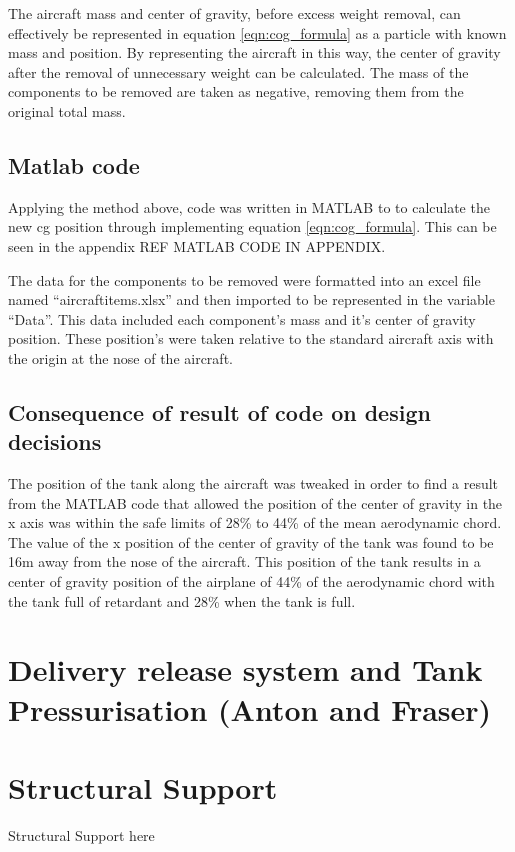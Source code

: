 The aircraft mass and center of gravity, before excess weight removal, can effectively be represented in equation \ref{eqn:cog_formula} as a particle with known mass and position.
By representing the aircraft in this way, the center of gravity after the removal of unnecessary weight can be calculated.
The mass of the components to be removed are taken as negative, removing them from the original total mass.

\subsection{Matlab code}
Applying the method above, code was written in MATLAB to to calculate the new cg position through implementing equation \ref{eqn:cog_formula}.
This can be seen in the appendix REF MATLAB CODE IN APPENDIX.



The data for the components to be removed were formatted into an excel file named “aircraftitems.xlsx” and then imported to be represented in the variable “Data”.
This data included each component's mass and it's center of gravity position.
These position's were taken relative to the standard aircraft axis with the origin at the nose of the aircraft.

\subsection{Consequence of result of code on design decisions}

The position of the tank along the aircraft was tweaked in order to find a result from the MATLAB code that allowed the position of the center of gravity in the x axis was within the safe limits of 28\% to 44\% of the mean aerodynamic chord.
The value of the x position of the center of gravity of the tank was found to be 16m away from the nose of the aircraft.
This position of the tank results in a center of gravity position of the airplane of 44\% of the aerodynamic chord with the tank full of retardant and 28\% when the tank is full. 

\section{Delivery release system and  Tank Pressurisation (Anton and Fraser)}
\section{Structural Support}
Structural Support here

